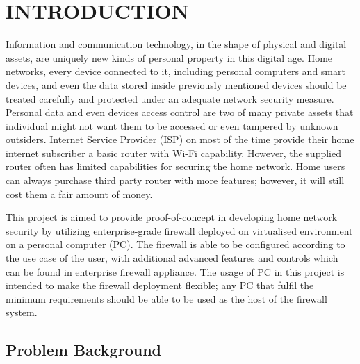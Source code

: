 \documentclass[../index.tex]{subfiles}
\begin{document}
\chapter{INTRODUCTION}
 \setcounter{page}{1}

Information and communication technology, in the shape of physical and digital assets, are uniquely
new kinds of personal property in this digital age. Home networks, every device connected to it,
including personal computers and smart devices, and even the data stored inside previously mentioned
devices should be treated carefully and protected under an adequate network security measure.
Personal data and even devices access control are two of many private assets that individual might
not want them to be accessed or even tampered by unknown outsiders. Internet Service Provider (ISP)
on most of the time provide their home internet subscriber a basic router with Wi-Fi capability.
However, the supplied router often has limited capabilities for securing the home network. Home
users can always purchase third party router with more features; however, it will still cost them a
fair amount of money.

This project is aimed to provide proof-of-concept in developing home network security by utilizing
enterprise-grade firewall deployed on virtualised environment on a personal computer (PC). The
firewall is able to be configured according to the use case of the user, with additional advanced
features and controls which can be found in enterprise firewall appliance. The usage of PC in this
project is intended to make the firewall deployment flexible; any PC that fulfil the minimum
requirements should be able to be used as the host of the firewall system.

\section{Problem Background}
\end{document}

